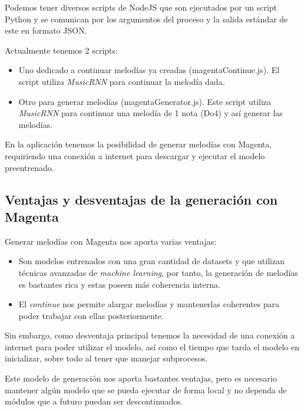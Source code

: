     Podemos tener diversos scripts de NodeJS que son ejecutados por un script Python y se comunican por los argumentos del proceso y la salida estándar de este en formato JSON. 

    Actualmente tenemos 2 scripts: 
    \begin{itemize}
        \item Uno dedicado a continuar melodías ya creadas (magentaContinue.js). El script utiliza \textit{MusicRNN} para continuar la melodía dada.
        \item Otro para generar melodías (magentaGenerator.js). Este script utiliza \textit{MusicRNN} para continuar una melodía de 1 nota (Do4) y así generar las melodías.
    \end{itemize}

    En la aplicación tenemos la posibilidad de generar melodías con Magenta, requiriendo una conexión a internet para descargar y ejecutar el modelo preentrenado.

    \subsection{Ventajas y desventajas de la generación con Magenta}
    \label{ventajasYDesventajasMagenta}
    Generar melodías con Magenta nos aporta varias ventajas:

    \begin{itemize}
        \item Son modelos entrenados con una gran cantidad de datasets y que utilizan técnicas avanzadas de \textit{machine learning}, por tanto, la generación de melodías es bastantes rica y estas poseen más coherencia interna.
        \item El \textit{continue} nos permite alargar melodías y mantenerlas coherentes para poder trabajar con ellas posteriormente.
    \end{itemize}

    Sin embargo, como desventaja principal tenemos la necesidad de una conexión a internet para poder utilizar el modelo, así como el tiempo que tarda el modelo en inicializar, sobre todo al tener que manejar subprocesos.

    Este modelo de generación nos aporta bastantes ventajas, pero es necesario mantener algún modelo que se pueda ejecutar de forma local y no dependa de módulos que a futuro puedan ser descontinuados.